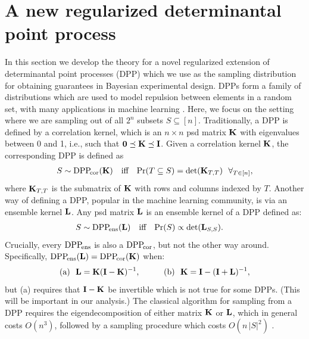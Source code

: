 \documentclass[thesis.tex]{subfiles}
\begin{document}
\section{A new regularized determinantal point process}
\label{s:r-dpp}
  In this section we develop the theory for a novel regularized extension of
  determinantal point processes (DPP) which we use as the sampling distribution
  for obtaining guarantees in Bayesian experimental design.
  DPPs form a family of distributions which are used to model repulsion between
  elements in a random set, with many applications in machine learning
  \citep{dpp-ml}. Here, we focus on the setting where we are sampling out of all
  $2^n$ subsets $S\subseteq[n]$. Traditionally, a DPP is defined by a
  correlation kernel, which is an $n\times n$ psd matrix $\mathbf K$ with eigenvalues
  between 0 and 1, i.e., such that $\mathbf 0\preceq\mathbf K\preceq \mathbf I$. Given a
  correlation kernel $\mathbf K$, the corresponding DPP is
  defined as
  \begin{align*}
    S\sim{{\mathrm{DPP}}_{\!\mathrm{cor}}}(\mathbf K)\quad\text{iff}\quad
    \mathrm{Pr}(T\subseteq S) = \det(\mathbf K_{T,T})\ \  \forall_{T\in[n]},
  \end{align*}
where $\mathbf K_{T,T}$ is the submatrix of $\mathbf K$ with rows and columns
indexed by $T$. Another way of defining a DPP, popular in the machine
learning community, is via an ensemble kernel $\mathbf{L}$. Any psd matrix
$\mathbf{L}$ is an ensemble kernel of a DPP defined as:
  \begin{align*}
    S\sim{{\mathrm{DPP}}_{\!\mathrm{ens}}}(\mathbf{L})\quad\text{iff}\quad \mathrm{Pr}(S) \propto \det(\mathbf{L}_{S,S}).\quad~
  \end{align*}
Crucially, every ${{\mathrm{DPP}}_{\!\mathrm{ens}}}$ is also a ${{\mathrm{DPP}}_{\!\mathrm{cor}}}$, but not the other way
around. Specifically, ${{\mathrm{DPP}}_{\!\mathrm{ens}}}(\mathbf{L})={{\mathrm{DPP}}_{\!\mathrm{cor}}}(\mathbf K)$ when:
\begin{align*}
  &\text{(a)}\ \  \mathbf{L}=\mathbf K(\mathbf I-\mathbf K)^{-1},\qquad
  &\text{(b)}\ \  \mathbf K = \mathbf I -  (\mathbf I+\mathbf{L})^{-1},
\end{align*}
but (a) requires that $\mathbf I-\mathbf K$ be invertible which is not true
for some DPPs.
(This will be important in our analysis.)
The classical algorithm for sampling from a DPP requires the
eigendecomposition of either matrix $\mathbf K$ or $\mathbf{L}$, which in general
costs $O(n^3)$, followed by a sampling procedure which costs
$O(n\,|S|^2)$ \cite{dpp-independence,dpp-ml}.
\end{document}
